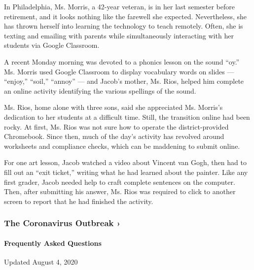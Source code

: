 In Philadelphia, Ms. Morris, a 42-year veteran, is in her last semester
before retirement, and it looks nothing like the farewell she expected.
Nevertheless, she has thrown herself into learning the technology to
teach remotely. Often, she is texting and emailing with parents while
simultaneously interacting with her students via Google Classroom.

A recent Monday morning was devoted to a phonics lesson on the sound
``oy.'' Ms. Morris used Google Classroom to display vocabulary words on
slides --- ``enjoy,'' ``soil,'' ``annoy'' --- and Jacob's mother, Ms.
Rios, helped him complete an online activity identifying the various
spellings of the sound.

Ms. Rios, home alone with three sons, said she appreciated Ms. Morris's
dedication to her students at a difficult time. Still, the transition
online had been rocky. At first, Ms. Rios was not sure how to operate
the district-provided Chromebook. Since then, much of the day's activity
has revolved around worksheets and compliance checks, which can be
maddening to submit online.

For one art lesson, Jacob watched a video about Vincent van Gogh, then
had to fill out an ``exit ticket,'' writing what he had learned about
the painter. Like any first grader, Jacob needed help to craft complete
sentences on the computer. Then, after submitting his answer, Ms. Rios
was required to click to another screen to report that he had finished
the activity.

\href{https://www.nytimes3xbfgragh.onion/news-event/coronavirus?action=click\&pgtype=Article\&state=default\&region=MAIN_CONTENT_3\&context=storylines_faq}{}

\hypertarget{the-coronavirus-outbreak-}{%
\subsubsection{The Coronavirus Outbreak
›}\label{the-coronavirus-outbreak-}}

\hypertarget{frequently-asked-questions}{%
\paragraph{Frequently Asked
Questions}\label{frequently-asked-questions}}

Updated August 4, 2020

